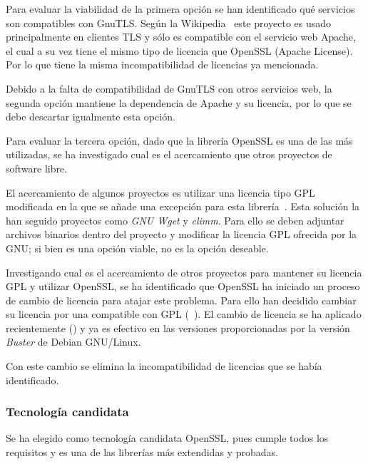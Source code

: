 \par Para evaluar la viabilidad de la primera opción se han identificado qué servicios son compatibles con GnuTLS. Según la Wikipedia~\cite{wiki:gnutls} este proyecto es usado principalmente en clientes TLS y sólo es compatible con el servicio
web Apache, el cual a su vez tiene el mismo tipo de licencia que OpenSSL (Apache License). Por lo que tiene la misma incompatibilidad de licencias ya mencionada.

\par Debido a la falta de compatibilidad de GnuTLS con otros servicios web, la segunda opción mantiene la dependencia de Apache y su licencia, por lo que  se debe descartar igualmente esta opción.

\par Para evaluar la tercera opción, dado que la librería OpenSSL es una de las más utilizadas, se ha investigado cual es el acercamiento que otros proyectos de software libre.
\par El acercamiento de algunos proyectos es utilizar una licencia tipo GPL modificada en la que se añade una excepción para esta librería~\cite{opensslexception}. Esta solución la han seguido proyectos como {\em GNU Wget} y {\em climm}. Para
ello se deben adjuntar archivos binarios dentro del proyecto y modificar la licencia GPL ofrecida por la GNU; si bien es una opción viable, no es la opción deseable.
\par Investigando cual es el acercamiento de otros proyectos para mantener su licencia GPL y utilizar OpenSSL, se ha identificado que OpenSSL ha iniciado un proceso de cambio de licencia para atajar este problema. Para ello han decidido
cambiar su licencia por una compatible con GPL (~\cite[Anuncio del cambio de licencia]{opensslannouncement}). El cambio de licencia se ha aplicado recientemente (\cite[{\em Pull request} del cambio]{opensslpullrequest}) y ya es efectivo en las
versiones proporcionadas por la versión {\em Buster} de Debian GNU/Linux.
\par Con este cambio se elimina la incompatibilidad de licencias que se había identificado.

\subsubsection{Tecnología candidata}
\par Se ha elegido como tecnología candidata OpenSSL, pues cumple todos los requisitos y es una de las librerías más extendidas y probadas.

